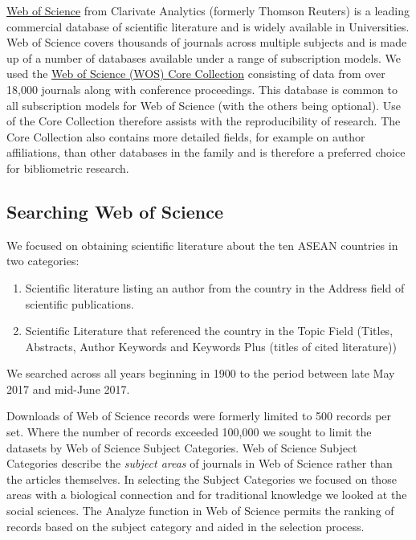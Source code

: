 \documentclass[openany]{book}
\providecommand{\tightlist}{%
  \setlength{\itemsep}{0pt}\setlength{\parskip}{0pt}}
\theoremstyle{definition}
\theoremstyle{definition}
\theoremstyle{definition}
\theoremstyle{remark}
\begin{document}
\href{https://clarivate.com/products/web-of-science/web-science-form/web-science-core-collection/}{Web
of Science} from Clarivate Analytics (formerly Thomson Reuters) is a
leading commercial database of scientific literature and is widely
available in Universities. Web of Science covers thousands of journals
across multiple subjects and is made up of a number of databases
available under a range of subscription models. We used the
\href{https://clarivate.com/products/web-of-science/web-science-form/web-science-core-collection/}{Web
of Science (WOS) Core Collection} consisting of data from over 18,000
journals along with conference proceedings. This database is common to
all subscription models for Web of Science (with the others being
optional). Use of the Core Collection therefore assists with the
reproducibility of research. The Core Collection also contains more
detailed fields, for example on author affiliations, than other
databases in the family and is therefore a preferred choice for
bibliometric research.

\hypertarget{searching-web-of-science}{%
\subsection{Searching Web of Science}\label{searching-web-of-science}}

We focused on obtaining scientific literature about the ten ASEAN
countries in two categories:

\begin{enumerate}
\def\labelenumi{\arabic{enumi}.}
\tightlist
\item
  Scientific literature listing an author from the country in the
  Address field of scientific publications.
\item
  Scientific Literature that referenced the country in the Topic Field
  (Titles, Abstracts, Author Keywords and Keywords Plus (titles of cited
  literature))
\end{enumerate}

We searched across all years beginning in 1900 to the period between
late May 2017 and mid-June 2017.

Downloads of Web of Science records were formerly limited to 500 records
per set. Where the number of records exceeded 100,000 we sought to limit
the datasets by Web of Science Subject Categories. Web of Science
Subject Categories describe the \emph{subject areas} of journals in Web
of Science rather than the articles themselves. In selecting the Subject
Categories we focused on those areas with a biological connection and
for traditional knowledge we looked at the social sciences. The Analyze
function in Web of Science permits the ranking of records based on the
subject category and aided in the selection process.
\end{document}
